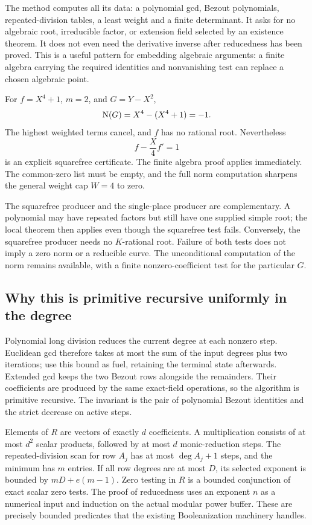 The method computes all its data: a polynomial gcd, Bezout polynomials, repeated-division tables, a least weight and a finite determinant. It asks for no algebraic root, irreducible factor, or extension field selected by an existence theorem. It does not even need the derivative inverse after reducedness has been proved. This is a useful pattern for embedding algebraic arguments: a finite algebra carrying the required identities and nonvanishing test can replace a chosen algebraic point.

\begin{example}
For $f=X^4+1$, $m=2$, and $G=Y-X^2$,
\[
 \operatorname{N}(G)=X^4-(X^4+1)=-1.
\]
The highest weighted terms cancel, and $f$ has no rational root. Nevertheless
\[
 f-\frac X4 f'=1
\]
is an explicit squarefree certificate. The finite algebra proof applies immediately. The common-zero list must be empty, and the full norm computation sharpens the general weight cap $W=4$ to zero.
\end{example}

\begin{remark}
The squarefree producer and the single-place producer are complementary. A polynomial may have repeated factors but still have one supplied simple root; the local theorem then applies even though the squarefree test fails. Conversely, the squarefree producer needs no $K$-rational root. Failure of both tests does not imply a zero norm or a reducible curve. The unconditional computation of the norm remains available, with a finite nonzero-coefficient test for the particular $G$.
\end{remark}

\subsection{Why this is primitive recursive uniformly in the degree}

Polynomial long division reduces the current degree at each nonzero step. Euclidean gcd therefore takes at most the sum of the input degrees plus two iterations; use this bound as fuel, retaining the terminal state afterwards. Extended gcd keeps the two Bezout rows alongside the remainders. Their coefficients are produced by the same exact-field operations, so the algorithm is primitive recursive. The invariant is the pair of polynomial Bezout identities and the strict decrease on active steps.

Elements of $R$ are vectors of exactly $d$ coefficients. A multiplication consists of at most $d^2$ scalar products, followed by at most $d$ monic-reduction steps. The repeated-division scan for row $A_j$ has at most $\deg A_j+1$ steps, and the minimum has $m$ entries. If all row degrees are at most $D$, its selected exponent is bounded by $mD+e(m-1)$. Zero testing in $R$ is a bounded conjunction of exact scalar zero tests. The proof of reducedness uses an exponent $n$ as a numerical input and induction on the actual modular power buffer. These are precisely bounded predicates that the existing Booleanization machinery handles.

